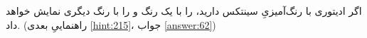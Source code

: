 \section{}
\paragraph{}\label{hint:287}
اگر ادیتوری با رنگ‌آمیزیِ سینتکس دارید،  را با یک رنگ و  را با رنگ دیگری نمایش خواهد داد. (راهنماییِ بعدی \ref{hint:215}، جواب \ref{answer:62})